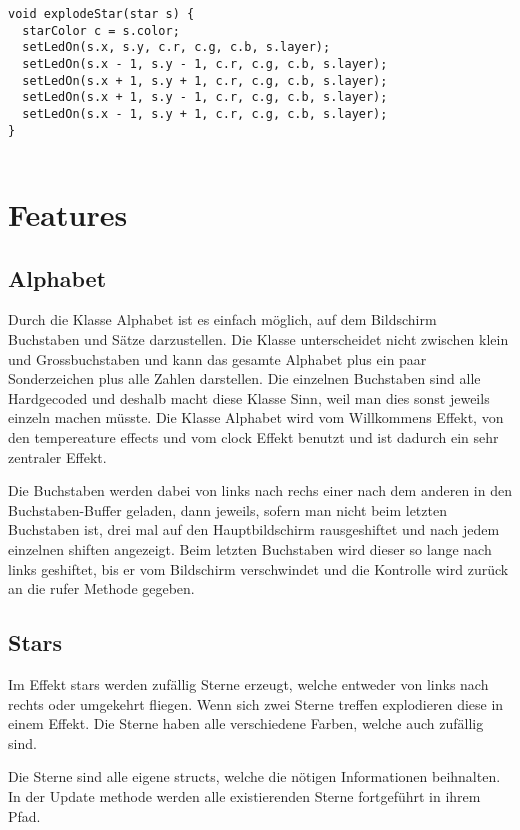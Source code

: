 \documentclass[12pt,a4paper]{article}
\begin{document}
\begin{lstlisting}[language=Arduino]
void explodeStar(star s) {
  starColor c = s.color;
  setLedOn(s.x, s.y, c.r, c.g, c.b, s.layer);
  setLedOn(s.x - 1, s.y - 1, c.r, c.g, c.b, s.layer);
  setLedOn(s.x + 1, s.y + 1, c.r, c.g, c.b, s.layer);
  setLedOn(s.x + 1, s.y - 1, c.r, c.g, c.b, s.layer);
  setLedOn(s.x - 1, s.y + 1, c.r, c.g, c.b, s.layer);
}
    
\end{lstlisting}

\section{Features}

\subsection{Alphabet}

Durch die Klasse Alphabet ist es einfach möglich, auf dem Bildschirm Buchstaben und Sätze darzustellen. Die Klasse unterscheidet nicht zwischen klein und Grossbuchstaben und kann das gesamte Alphabet plus ein paar Sonderzeichen plus alle Zahlen darstellen. Die einzelnen Buchstaben sind alle Hardgecoded und deshalb macht diese Klasse Sinn, weil man dies sonst jeweils einzeln machen müsste. Die Klasse Alphabet wird vom Willkommens Effekt, von den tempereature effects und vom clock Effekt benutzt und ist dadurch ein sehr zentraler Effekt.

Die Buchstaben werden dabei von links nach rechs einer nach dem anderen in den Buchstaben-Buffer geladen, dann jeweils, sofern man nicht beim letzten Buchstaben ist, drei mal auf den Hauptbildschirm rausgeshiftet und nach jedem einzelnen shiften angezeigt. Beim letzten Buchstaben wird dieser so lange nach links geshiftet, bis er vom Bildschirm verschwindet und die Kontrolle wird zurück an die rufer Methode gegeben.

\subsection{Stars}

Im Effekt stars werden zufällig Sterne erzeugt, welche entweder von links nach rechts oder umgekehrt fliegen. Wenn sich zwei Sterne treffen explodieren diese in einem Effekt. Die Sterne haben alle verschiedene Farben, welche auch zufällig sind. 

Die Sterne sind alle eigene structs, welche die nötigen Informationen beihnalten. In der Update methode werden alle existierenden Sterne fortgeführt in ihrem Pfad.
\end{document}
